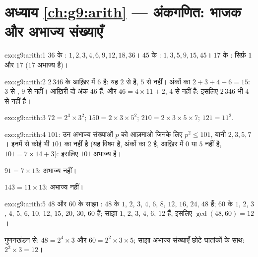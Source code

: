 \section*{अध्याय \ref{ch:g9:arith} --- अंकगणित: भाजक और अभाज्य संख्याएँ}

\begin{solution}{exo:g9:arith:1}
$36$ के : $1, 2, 3, 4, 6, 9, 12, 18, 36$।
$45$ के : $1, 3, 5, 9, 15, 45$।
$17$ के : सिर्फ़ $1$ और $17$ ($17$ अभाज्य है)।
\end{solution}

\begin{solution}{exo:g9:arith:2}
$2\,346$ के आख़िर में $6$ है: यह $2$ से  है, $5$ से नहीं। अंकों
का  $2 + 3 + 4 + 6 = 15$: $3$ से , $9$ से नहीं। आख़िरी दो
अंक $46$ हैं, और $46 = 4 \times 11 + 2$, $4$ से  नहीं है:
इसलिए $2\,346$ भी $4$ से  नहीं है।
\end{solution}

\begin{solution}{exo:g9:arith:3}
$72 = 2^3 \times 3^2$; \quad
$150 = 2 \times 3 \times 5^2$; \quad
$210 = 2 \times 3 \times 5 \times 7$; \quad
$121 = 11^2$.
\end{solution}

\begin{solution}{exo:g9:arith:4}
$101$: उन अभाज्य संख्याओं $p$ को आज़माओ जिनके लिए $p^2 \leq 101$,
यानी $2, 3, 5, 7$। इनमें से कोई भी $101$ का  नहीं है (यह विषम है,
अंकों का  $2$ है, आख़िर में $0$ या $5$ नहीं है,
$101 = 7 \times 14 + 3$): इसलिए $101$ अभाज्य है।

$91 = 7 \times 13$: अभाज्य नहीं।

$143 = 11 \times 13$: अभाज्य नहीं।
\end{solution}

\begin{solution}{exo:g9:arith:5}
$48$ और $60$ के साझा : $48$ के  $1$, $2$, $3$, $4$, $6$,
$8$, $12$, $16$, $24$, $48$ हैं; $60$ के  $1$, $2$, $3$, $4$,
$5$, $6$, $10$, $12$, $15$, $20$, $30$, $60$ हैं; साझा  $1$,
$2$, $3$, $4$, $6$, $12$ हैं, इसलिए $\gcd(48,60) = 12$।

गुणनखंडन से: $48 = 2^4 \times 3$ और $60 = 2^2 \times 3 \times 5$;
साझा अभाज्य संख्याएँ छोटे घातांकों के साथ: $2^2 \times 3 = 12$।
\end{solution}

